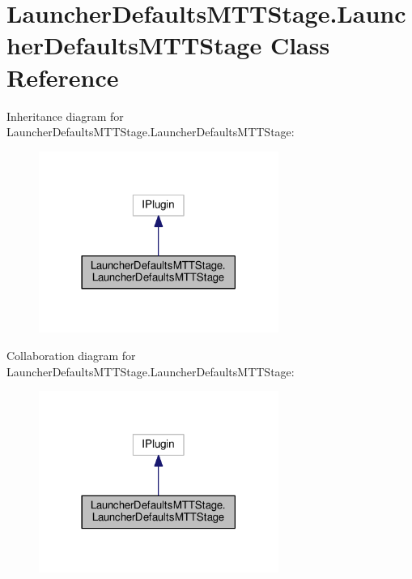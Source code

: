\hypertarget{classLauncherDefaultsMTTStage_1_1LauncherDefaultsMTTStage}{\section{Launcher\-Defaults\-M\-T\-T\-Stage.\-Launcher\-Defaults\-M\-T\-T\-Stage Class Reference}
\label{classLauncherDefaultsMTTStage_1_1LauncherDefaultsMTTStage}
}


Inheritance diagram for Launcher\-Defaults\-M\-T\-T\-Stage.\-Launcher\-Defaults\-M\-T\-T\-Stage\-:
\nopagebreak
\begin{figure}[H]
\begin{center}
\leavevmode
\includegraphics[width=222pt]{classLauncherDefaultsMTTStage_1_1LauncherDefaultsMTTStage__inherit__graph}
\end{center}
\end{figure}


Collaboration diagram for Launcher\-Defaults\-M\-T\-T\-Stage.\-Launcher\-Defaults\-M\-T\-T\-Stage\-:
\nopagebreak
\begin{figure}[H]
\begin{center}
\leavevmode
\includegraphics[width=222pt]{classLauncherDefaultsMTTStage_1_1LauncherDefaultsMTTStage__coll__graph}
\end{center}
\end{figure}
